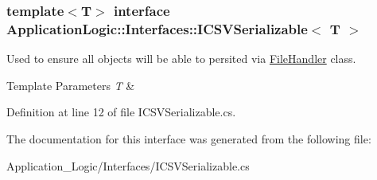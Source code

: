 \subsubsection*{template$<$T$>$ interface ApplicationLogic::Interfaces::ICSVSerializable$<$ T $>$}

Used to ensure all objects will be able to persited via \hyperlink{class_application_logic_1_1_file_handler-g}{FileHandler} class. 
\begin{DoxyTemplParams}{Template Parameters}
{\em T} & \\
\hline
\end{DoxyTemplParams}


Definition at line 12 of file ICSVSerializable.cs.



The documentation for this interface was generated from the following file:\begin{DoxyCompactItemize}
\item 
Application\_\-Logic/Interfaces/ICSVSerializable.cs\end{DoxyCompactItemize}
